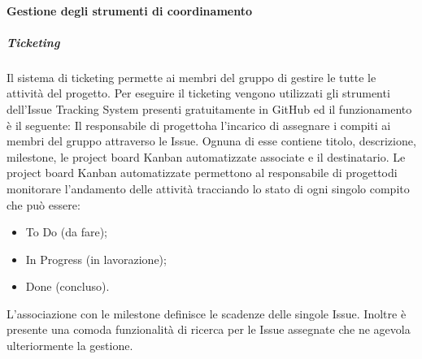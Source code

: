 			\paragraph{Gestione degli strumenti di coordinamento}
				\subparagraph*{Ticketing}
					Il sistema di ticketing permette ai membri del gruppo di gestire le tutte le attività del progetto\glo.
					Per eseguire il ticketing vengono utilizzati gli strumenti dell'Issue Tracking System presenti gratuitamente in GitHub ed il funzionamento è il seguente:
					Il responsabile di progetto\glosp ha l'incarico di assegnare i compiti ai membri del gruppo attraverso le Issue. Ognuna di esse contiene titolo, descrizione,  milestone, le project board Kanban automatizzate associate e il destinatario.
					Le project board Kanban automatizzate permettono al responsabile di progetto\glosp di monitorare l'andamento delle attività tracciando lo stato di ogni singolo compito che può essere:
					\begin{itemize}
						\item To Do (da fare);
						\item In Progress (in lavorazione);
						\item Done (concluso).
					\end{itemize}
					L'associazione con le milestone definisce le scadenze delle singole Issue.
					Inoltre è presente una comoda funzionalità di ricerca per le Issue assegnate che ne agevola ulteriormente la gestione.

